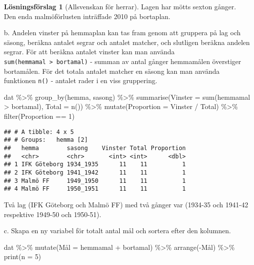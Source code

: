 \documentclass[
]{book}
\newenvironment{Shaded}{\begin{snugshade}}{\end{snugshade}}
\newcommand{\AttributeTok}[1]{\textcolor[rgb]{0.77,0.63,0.00}{#1}}
\newcommand{\DecValTok}[1]{\textcolor[rgb]{0.00,0.00,0.81}{#1}}
\newcommand{\FunctionTok}[1]{\textcolor[rgb]{0.00,0.00,0.00}{#1}}
\newcommand{\NormalTok}[1]{#1}
\newcommand{\OtherTok}[1]{\textcolor[rgb]{0.56,0.35,0.01}{#1}}
\newcommand{\SpecialCharTok}[1]{\textcolor[rgb]{0.00,0.00,0.00}{#1}}
\theoremstyle{definition}
\theoremstyle{definition}
\theoremstyle{definition}
\theoremstyle{definition}
\newtheorem{hypothesis}{Lösningsförslag}[chapter]
\theoremstyle{remark}
\begin{document}
\begin{hypothesis}[Allsvenskan för herrar]
Lagen har mötts sexton gånger. Den enda malmöförlusten inträffade 2010 på bortaplan.

b. Andelen vinster på hemmaplan kan tas fram genom att gruppera på lag och säsong, beräkna antalet segrar och antalet matcher, och slutligen beräkna andelen segrar.
För att beräkna antalet vinster kan man använda \texttt{sum(hemmamal\ \textgreater{}\ bortamal)} - summan av antal gånger hemmamålen överstiger bortamålen. För det totala antalet matcher en säsong kan man använda funktionen \texttt{n()} - antalet rader i en viss gruppering.

\begin{Shaded}
\begin{Highlighting}[]
\NormalTok{dat }\SpecialCharTok{\%\textgreater{}\%} 
  \FunctionTok{group\_by}\NormalTok{(hemma, sasong) }\SpecialCharTok{\%\textgreater{}\%} 
  \FunctionTok{summarise}\NormalTok{(}\AttributeTok{Vinster =} \FunctionTok{sum}\NormalTok{(hemmamal }\SpecialCharTok{\textgreater{}}\NormalTok{ bortamal), }\AttributeTok{Total =} \FunctionTok{n}\NormalTok{()) }\SpecialCharTok{\%\textgreater{}\%} 
  \FunctionTok{mutate}\NormalTok{(}\AttributeTok{Proportion =}\NormalTok{ Vinster }\SpecialCharTok{/}\NormalTok{ Total) }\SpecialCharTok{\%\textgreater{}\%} 
  \FunctionTok{filter}\NormalTok{(Proportion }\SpecialCharTok{==} \DecValTok{1}\NormalTok{)}
\end{Highlighting}
\end{Shaded}

\begin{verbatim}
## # A tibble: 4 x 5
## # Groups:   hemma [2]
##   hemma        sasong    Vinster Total Proportion
##   <chr>        <chr>       <int> <int>      <dbl>
## 1 IFK Göteborg 1934_1935      11    11          1
## 2 IFK Göteborg 1941_1942      11    11          1
## 3 Malmö FF     1949_1950      11    11          1
## 4 Malmö FF     1950_1951      11    11          1
\end{verbatim}

Två lag (IFK Göteborg och Malmö FF) med två gånger var (1934-35 och 1941-42 respektive 1949-50 och 1950-51).

c. Skapa en ny variabel för totalt antal mål och sortera efter den kolumnen.

\begin{Shaded}
\begin{Highlighting}[]
\NormalTok{dat }\SpecialCharTok{\%\textgreater{}\%} 
  \FunctionTok{mutate}\NormalTok{(Mål }\OtherTok{=}\NormalTok{ hemmamal }\SpecialCharTok{+}\NormalTok{ bortamal) }\SpecialCharTok{\%\textgreater{}\%} 
  \FunctionTok{arrange}\NormalTok{(}\SpecialCharTok{{-}}\NormalTok{Mål) }\SpecialCharTok{\%\textgreater{}\%} 
  \FunctionTok{print}\NormalTok{(}\AttributeTok{n =} \DecValTok{5}\NormalTok{)}
\end{Highlighting}
\end{Shaded}


\end{hypothesis}
\end{document}

